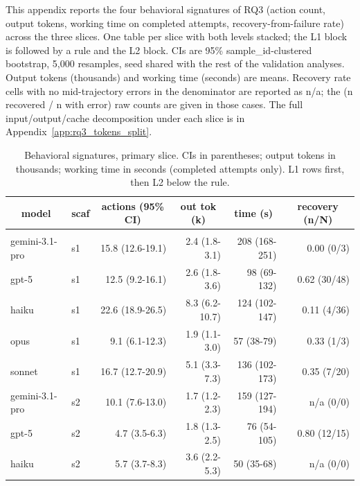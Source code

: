\documentclass[10pt]{article} %
\begin{document}
    This appendix reports the four behavioral signatures of RQ3 (action count, output tokens, working time on completed attempts, recovery-from-failure rate) across the three slices. One table per slice with both levels stacked; the L1 block is followed by a rule and the L2 block. CIs are 95\% sample\_id-clustered bootstrap, 5{,}000 resamples, seed shared with the rest of the validation analyses. Output tokens (thousands) and working time (seconds) are means. Recovery rate cells with no mid-trajectory errors in the denominator are reported as n/a; the (n recovered / n with error) raw counts are given in those cases. The full input/output/cache decomposition under each slice is in Appendix~\ref{app:rq3_tokens_split}.

    \begin{table}[h]
        \caption{Behavioral signatures, primary slice. CIs in parentheses; output tokens in thousands; working time in seconds (completed attempts only). L1 rows first, then L2 below the rule.}
    \label{tab:rq3_primary}
    \begin{center}
    \footnotesize
    \begin{tabular}{llrrrr}
        \multicolumn{1}{c}{\bf model} & \multicolumn{1}{c}{\bf scaf} & \multicolumn{1}{c}{\bf actions (95\% CI)} & \multicolumn{1}{c}{\bf out tok (k)} & \multicolumn{1}{c}{\bf time (s)} & \multicolumn{1}{c}{\bf recovery (n/N)} \\
        \hline \\
        gemini-3.1-pro & s1 & 15.8 (12.6-19.1) & 2.4 (1.8-3.1)  & 208 (168-251) & 0.00 (0/3) \\
        gpt-5          & s1 & 12.5 (9.2-16.1)  & 2.6 (1.8-3.6)  & 98 (69-132)   & 0.62 (30/48) \\
        haiku          & s1 & 22.6 (18.9-26.5) & 8.3 (6.2-10.7) & 124 (102-147) & 0.11 (4/36) \\
        opus           & s1 & 9.1 (6.1-12.3)   & 1.9 (1.1-3.0)  & 57 (38-79)    & 0.33 (1/3) \\
        sonnet         & s1 & 16.7 (12.7-20.9) & 5.1 (3.3-7.3)  & 136 (102-173) & 0.35 (7/20) \\
        gemini-3.1-pro & s2 & 10.1 (7.6-13.0)  & 1.7 (1.2-2.3)  & 159 (127-194) & n/a (0/0) \\
        gpt-5          & s2 & 4.7 (3.5-6.3)    & 1.8 (1.3-2.5)  & 76 (54-105)   & 0.80 (12/15) \\
        haiku          & s2 & 5.7 (3.7-8.3)    & 3.6 (2.2-5.3)  & 50 (35-68)    & n/a (0/0) \\

\end{tabular}
\end{center}
\end{table}
\end{document}
